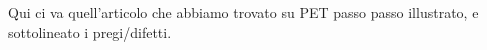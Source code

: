 Qui ci va quell'articolo che abbiamo trovato su PET passo passo illustrato, e sottolineato i pregi/difetti.